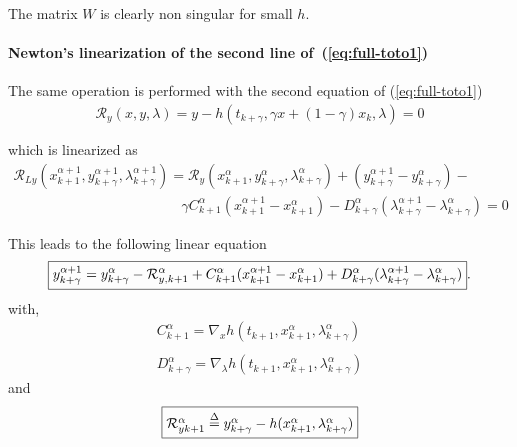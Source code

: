 The matrix $W$ is clearly non singular for small $h$.


 \paragraph{Newton's linearization of the second  line of~(\ref{eq:full-toto1})}
The same operation is performed with the second equation of (\ref{eq:full-toto1})
\begin{equation}
  \begin{array}{l}
    \mathcal R_y(x,y,\lambda)=y-h(t_{k+\gamma},\gamma x + (1-\gamma) x_k ,\lambda) =0\\ \\
  \end{array}
\end{equation}
which is linearized as
\begin{equation}
  \label{eq:full-NL9}
  \begin{array}{l}
    \mathcal R_{Ly}(x^{\alpha+1}_{k+1},y^{\alpha+1}_{k+\gamma},\lambda^{\alpha+1}_{k+\gamma}) = \mathcal
    R_{y}(x^{\alpha}_{k+1},y^{\alpha}_{k+\gamma},\lambda^{\alpha}_{k+\gamma}) +
    (y^{\alpha+1}_{k+\gamma}-y^{\alpha}_{k+\gamma})- \\[2mm] \qquad  \qquad \qquad \qquad  \qquad \qquad
    \gamma C^{\alpha}_{k+1}(x^{\alpha+1}_{k+1}-x^{\alpha}_{k+1}) - D^{\alpha}_{k+\gamma}(\lambda^{\alpha+1}_{k+\gamma}-\lambda^{\alpha}_{k+\gamma})=0
  \end{array}
\end{equation}

This leads to the following linear equation
\begin{equation}
  \boxed{y^{\alpha+1}_{k+\gamma} =  y^{\alpha}_{k+\gamma}
  -\mathcal R^{\alpha}_{y,k+1}+ \\
  C^{\alpha}_{k+1}(x^{\alpha+1}_{k+1}-x^{\alpha}_{k+1}) +
  D^{\alpha}_{k+\gamma}(\lambda^{\alpha+1}_{k+\gamma}-\lambda^{\alpha}_{k+\gamma})}. \label{eq:full-NL11y}
\end{equation}
with,
\begin{equation}
     \begin{array}{l}
  C^{\alpha}_{k+1} = \nabla_xh(t_{k+1}, x^{\alpha}_{k+1},\lambda^{\alpha}_{k+\gamma} ) \\ \\
  D^{\alpha}_{k+\gamma} = \nabla_{\lambda}h(t_{k+1}, x^{\alpha}_{k+1},\lambda^{\alpha}_{k+\gamma})
 \end{array}
\end{equation}
and
\begin{equation}\fbox{$
\mathcal R^{\alpha}_{yk+1} \stackrel{\Delta}{=} y^{\alpha}_{k+\gamma} - h(x^{\alpha}_{k+1},\lambda^{\alpha}_{k+\gamma})$}
 \end{equation}

